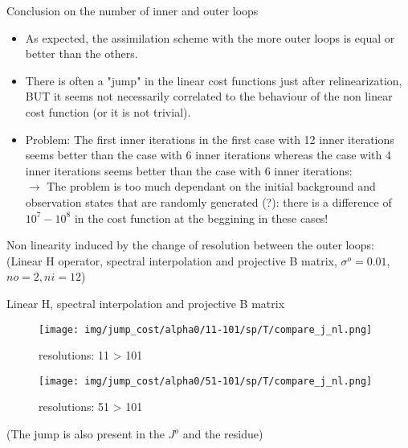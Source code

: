 \documentclass[francais]{beamer}
\begin{document}
\begin{frame}{Conclusion on the number of inner and outer loops}
\begin{itemize}
 \item As expected, the assimilation scheme with the more outer loops is equal or better than the others. 
 \item There is often a "jump" in the linear cost functions just after relinearization, BUT it seems not necessarily correlated to the behaviour of the non linear cost function (or it is not trivial).
 \item Problem: The first inner iterations in the first case with 12 inner iterations seems better than the case with 6 inner iterations whereas the case with 4 inner iterations seems better than the case with 6 inner iterations:\\
 $\longrightarrow$ The problem is too much dependant on the initial background and observation states that are randomly generated (?): there is a difference of $10^7 - 10^8$ in the cost function at the beggining in these cases! 
\end{itemize}
\end{frame}

\begin{frame}
\begin{center}
\huge{Non linearity induced by the change of resolution between the outer loops:}\\
\vspace{+0.5cm}
 \Large{(Linear H operator, spectral interpolation and projective B matrix, $\sigma^o=0.01$, $no=2, ni=12$)}
\end{center}
\end{frame}

\begin{frame}{Linear H, spectral interpolation and projective B matrix}
\begin{center}
\begin{figure}
  \texttt{[image: img/jump\_cost/alpha0/11-101/sp/T/compare\_j\_nl.png]}
  \caption{resolutions: 11 > 101}
\endminipage\hfill
{}
  \texttt{[image: img/jump\_cost/alpha0/51-101/sp/T/compare\_j\_nl.png]}
  \caption{resolutions: 51 > 101}
\endminipage
\end{figure}
(The jump is also present in the $J^o$ and the residue)
\end{center}
\end{frame}
\end{document}
